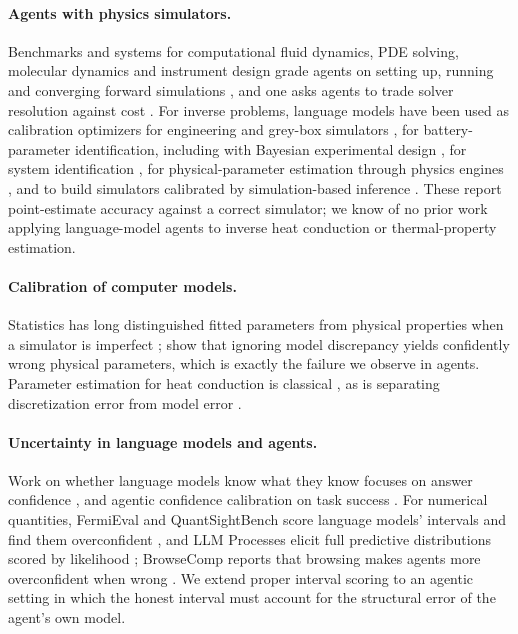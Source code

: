 \documentclass[10pt]{article}
\begin{document}
\paragraph{Agents with physics simulators.} Benchmarks and systems for computational fluid dynamics, PDE solving,
molecular dynamics and instrument design grade agents on setting up, running and converging forward simulations
\citep{somasekharan2026cfdllmbench,yue2026foamagent,hang2026pdeagentbench,mudur2025feabench,anon2026mdgym,anon2026neutrongym},
and one asks agents to trade solver resolution against cost \citep{zhang2025caed}. For inverse problems, language models
have been used as calibration optimizers for engineering and grey-box simulators \citep{wang2026calibrationagent,gomez2026agentic},
for battery-parameter identification, including with Bayesian experimental design \citep{chen2026batterysim,anon2026bkbagent},
for system identification \citep{piga2026asia}, for physical-parameter estimation through physics engines
\citep{cherian2026llmphy}, and to build simulators calibrated by simulation-based inference \citep{holt2025gsim}. These
report point-estimate accuracy against a correct simulator; we know of no prior work applying language-model agents to
inverse heat conduction or thermal-property estimation.

\paragraph{Calibration of computer models.} Statistics has long distinguished fitted parameters from physical
properties when a simulator is imperfect \citep{kennedy2001bayesian}; \citet{brynjarsdottir2014learning} show that
ignoring model discrepancy yields confidently wrong physical parameters, which is exactly the failure we observe in
agents. Parameter estimation for heat conduction is classical
\citep{beck1977parameter,ozisik2000inverse,parker1961flash}, as is separating discretization error from model error
\citep{oberkampf2010verification}.

\paragraph{Uncertainty in language models and agents.} Work on whether language models know what they know focuses on
answer confidence \citep{kadavath2022language}, and agentic confidence calibration on task success
\citep{zhang2026agentic}. For numerical quantities, FermiEval and QuantSightBench score language models' intervals and
find them overconfident \citep{epstein2025fermieval,qin2026quantsightbench}, and LLM Processes elicit full predictive
distributions scored by likelihood \citep{requeima2024llmprocesses}; BrowseComp reports that browsing makes agents more
overconfident when wrong \citep{wei2025browsecomp}. We extend proper interval scoring \citep{gneiting2007strictly} to an
agentic setting in which the honest interval must account for the structural error of the agent's own model.
\end{document}
